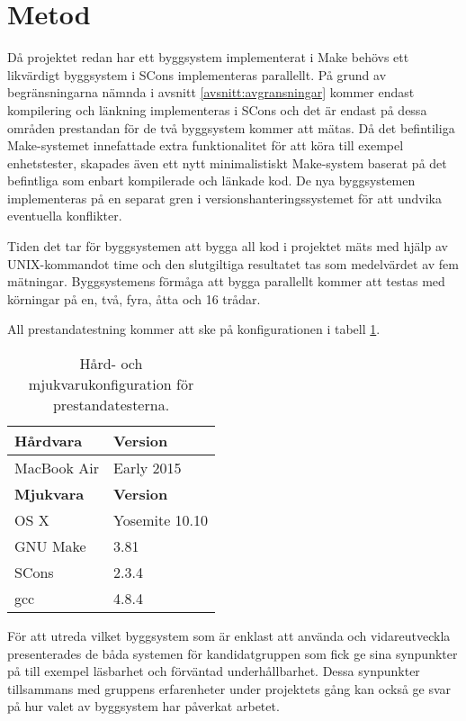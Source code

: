 \section{Metod} \label{avsnitt:metod}
Då projektet redan har ett byggsystem implementerat i Make behövs ett likvärdigt byggsystem i SCons implementeras parallellt. På grund av begränsningarna nämnda i avsnitt \ref{avsnitt:avgransningar} kommer endast kompilering och länkning implementeras i SCons och det är endast på dessa områden prestandan för de två byggsystem kommer att mätas. Då det befintiliga Make-systemet innefattade extra funktionalitet för att köra till exempel enhetstester, skapades även ett nytt minimalistiskt Make-system baserat på det befintliga som enbart kompilerade och länkade kod. De nya byggsystemen implementeras på en separat gren i versionshanteringssystemet för att undvika eventuella konflikter.

Tiden det tar för byggsystemen att bygga all kod i projektet mäts med hjälp av UNIX-kommandot time och den slutgiltiga resultatet tas som medelvärdet av fem mätningar. Byggsystemens förmåga att bygga parallellt kommer att testas med körningar på en, två, fyra, åtta och 16 trådar.

All prestandatestning kommer att ske på konfigurationen i tabell \ref{tabell:konfig}.

\begin{table}[h!]
  \centering
  \begin{tabular}{|l|l|}
    \hline
    \textbf{Hårdvara} & \textbf{Version} \\ \hline
    MacBook Air & Early 2015 \\ \hline
    \textbf{Mjukvara} & \textbf{Version} \\ \hline
    OS X & Yosemite 10.10 \\ \hline
    GNU Make & 3.81 \\ \hline
    SCons & 2.3.4 \\ \hline
    gcc & 4.8.4 \\ \hline
  \end{tabular}
  \caption{Hård- och mjukvarukonfiguration för prestandatesterna.}
  \label{tabell:konfig}
\end{table}

För att utreda vilket byggsystem som är enklast att använda och vidareutveckla presenterades de båda systemen för kandidatgruppen som fick ge sina synpunkter på till exempel läsbarhet och förväntad underhållbarhet. Dessa synpunkter tillsammans med gruppens erfarenheter under projektets gång kan också ge svar på hur valet av byggsystem har påverkat arbetet.
